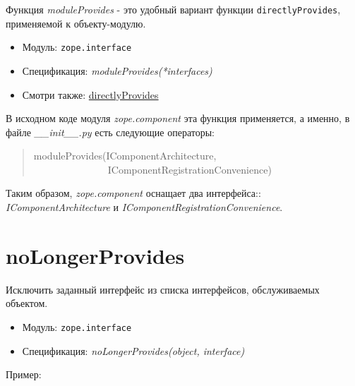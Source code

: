 \documentclass[14pt,a4paper,openany,twoside,final]{extbook}
\providecommand*{\DUroletitlereference}[1]{\textsl{#1}}
\begin{document}
Функция \DUroletitlereference{moduleProvides} - это удобный вариант функции
\texttt{directlyProvides}, применяемой к объекту-модулю.

\begin{itemize}

\item Модуль: \texttt{zope.interface}

\item Спецификация: \DUroletitlereference{moduleProvides(*interfaces)}

\item Смотри также: \hyperref[directlyprovides]{directlyProvides}

\end{itemize}

В исходном коде модуля \DUroletitlereference{zope.component} эта функция применяется, а
именно, в файле \DUroletitlereference{\_\_init\_\_.py} есть следующие операторы:

\begin{quote}{\ttfamily \raggedright \noindent
moduleProvides(IComponentArchitecture,\\
~~~~~~~~~~~~~~~IComponentRegistrationConvenience)
}
\end{quote}

Таким образом, \DUroletitlereference{zope.component} оснащает два интерфейса::
\DUroletitlereference{IComponentArchitecture} и \DUroletitlereference{IComponentRegistrationConvenience}.


\section*{noLongerProvides%
  \label{nolongerprovides}%
}

Исключить заданный интерфейс из списка интерфейсов, обслуживаемых
объектом.

\begin{itemize}

\item Модуль: \texttt{zope.interface}

\item Спецификация: \DUroletitlereference{noLongerProvides(object, interface)}

\end{itemize}

Пример:
\end{document}
